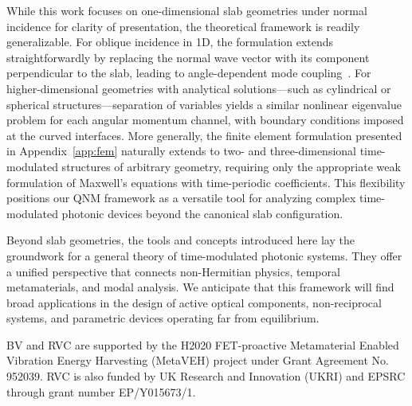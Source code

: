 \documentclass[%
 reprint,
 amsmath,amssymb,
 aps,
 prb,
]{revtex4-2}
\begin{document}
While this work focuses on one-dimensional slab geometries under normal incidence for clarity of presentation, the theoretical framework is readily generalizable. For oblique incidence in 1D, the formulation extends straightforwardly by replacing the normal wave vector with its component perpendicular to the slab, leading to angle-dependent mode coupling~\cite{taravati2017}. For higher-dimensional geometries with analytical solutions—such as cylindrical or spherical structures—separation of variables yields a similar nonlinear eigenvalue problem for each angular momentum channel, with boundary conditions imposed at the curved interfaces. More generally, the finite element formulation presented in Appendix~\ref{app:fem} naturally extends to two- and three-dimensional time-modulated structures of arbitrary geometry, requiring only the appropriate weak formulation of Maxwell's equations with time-periodic coefficients. This flexibility positions our QNM framework as a versatile tool for analyzing complex time-modulated photonic devices beyond the canonical slab configuration.

Beyond slab geometries, the tools and concepts introduced here lay the groundwork for a general theory of time-modulated photonic systems. They offer a unified perspective that connects non-Hermitian physics, temporal metamaterials, and modal analysis. We anticipate that this framework will find broad applications in the design of active optical components, non-reciprocal systems, and parametric devices operating far from equilibrium.


\begin{acknowledgments}
BV and RVC are supported by the H2020 FET-proactive Metamaterial Enabled Vibration Energy Harvesting (MetaVEH) project under Grant Agreement No. 952039. RVC is also funded by UK Research and Innovation (UKRI) and EPSRC through grant number EP/Y015673/1.
\end{acknowledgments}


\end{document}
